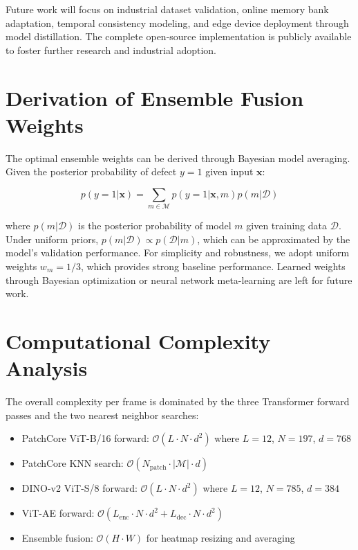 \documentclass[journal]{IEEEtran}
\begin{document}
Future work will focus on industrial dataset validation, online memory bank adaptation, temporal consistency modeling, and edge device deployment through model distillation. The complete open-source implementation is publicly available to foster further research and industrial adoption.

\appendices

\section{Derivation of Ensemble Fusion Weights}
\label{apx:weights}

The optimal ensemble weights can be derived through Bayesian model averaging. Given the posterior probability of defect $y=1$ given input $\mathbf{x}$:

\begin{equation}
    p(y=1|\mathbf{x}) = \sum_{m \in \mathcal{M}} p(y=1|\mathbf{x}, m) p(m|\mathcal{D})
    \label{eq:bayes_ensemble}
\end{equation}

where $p(m|\mathcal{D})$ is the posterior probability of model $m$ given training data $\mathcal{D}$. Under uniform priors, $p(m|\mathcal{D}) \propto p(\mathcal{D}|m)$, which can be approximated by the model's validation performance. For simplicity and robustness, we adopt uniform weights $w_m = 1/3$, which provides strong baseline performance. Learned weights through Bayesian optimization or neural network meta-learning are left for future work.

\section{Computational Complexity Analysis}
\label{apx:complexity}

The overall complexity per frame is dominated by the three Transformer forward passes and the two nearest neighbor searches:

\begin{itemize}[nosep]
    \item PatchCore ViT-B/16 forward: $\mathcal{O}(L \cdot N \cdot d^2)$ where $L=12$, $N=197$, $d=768$
    \item PatchCore KNN search: $\mathcal{O}(N_{\text{patch}} \cdot |\mathcal{M}| \cdot d)$
    \item DINO-v2 ViT-S/8 forward: $\mathcal{O}(L \cdot N \cdot d^2)$ where $L=12$, $N=785$, $d=384$
    \item ViT-AE forward: $\mathcal{O}(L_{\text{enc}} \cdot N \cdot d^2 + L_{\text{dec}} \cdot N \cdot d^2)$
    \item Ensemble fusion: $\mathcal{O}(H \cdot W)$ for heatmap resizing and averaging
\end{itemize}
\end{document}
